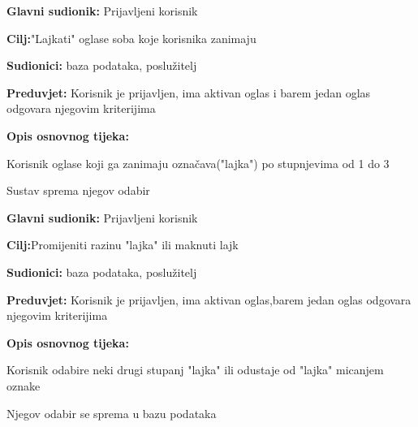 \noindent {}
\begin{packed_item}
	
	\item \textbf{Glavni sudionik: }Prijavljeni korisnik
	\item  \textbf{Cilj:}"Lajkati" oglase soba koje korisnika zanimaju
	\item  \textbf{Sudionici:} baza podataka, poslužitelj
	\item  \textbf{Preduvjet:} Korisnik je prijavljen, ima aktivan oglas i barem jedan oglas odgovara njegovim kriterijima
	\item  \textbf{Opis osnovnog tijeka:}
	
	\item[] \begin{packed_enum}
		
		\item Korisnik oglase koji ga zanimaju označava("lajka") po stupnjevima od 1 do 3
		\item Sustav sprema njegov odabir
	\end{packed_enum}
	
\end{packed_item}

\noindent {}
\begin{packed_item}
	
	\item \textbf{Glavni sudionik: }Prijavljeni korisnik
	\item  \textbf{Cilj:}Promijeniti razinu "lajka" ili maknuti lajk
	\item  \textbf{Sudionici:} baza podataka, poslužitelj
	\item  \textbf{Preduvjet:} Korisnik je prijavljen, ima aktivan oglas,barem jedan oglas odgovara njegovim kriterijima
	\item  \textbf{Opis osnovnog tijeka:}
	
	\item[] \begin{packed_enum}
		
		\item Korisnik odabire neki drugi stupanj "lajka" ili odustaje od "lajka" micanjem oznake
		\item Njegov odabir se sprema u bazu podataka
		
	\end{packed_enum}
	
\end{packed_item}

